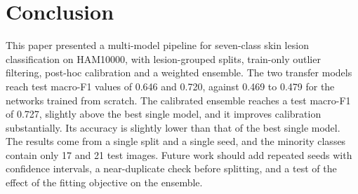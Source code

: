 \documentclass[10pt,twocolumn]{article}
\begin{document}
\section{Conclusion}
\label{sec:conclusion}

This paper presented a multi-model pipeline for seven-class skin lesion classification on HAM10000, with lesion-grouped splits, train-only outlier filtering, post-hoc calibration and a weighted ensemble. The two transfer models reach test macro-F1 values of 0.646 and 0.720, against 0.469 to 0.479 for the networks trained from scratch. The calibrated ensemble reaches a test macro-F1 of 0.727, slightly above the best single model, and it improves calibration substantially. Its accuracy is slightly lower than that of the best single model. The results come from a single split and a single seed, and the minority classes contain only 17 and 21 test images. Future work should add repeated seeds with confidence intervals, a near-duplicate check before splitting, and a test of the effect of the fitting objective on the ensemble.
\end{document}
